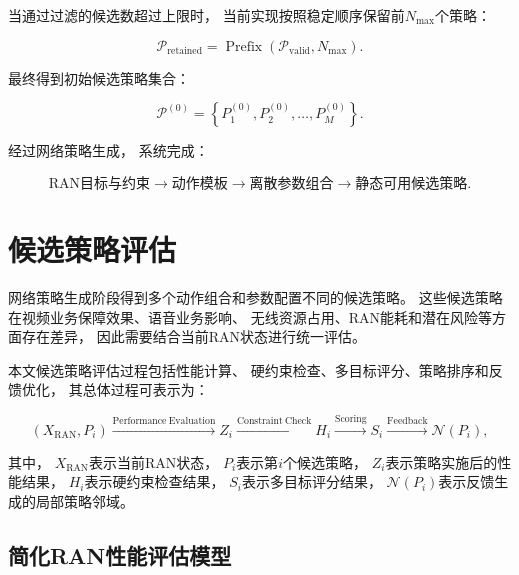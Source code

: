 \documentclass[lang=cn,12pt]{elegantbook}
\begin{document}
当通过过滤的候选数超过上限时，
当前实现按照稳定顺序保留前$N_{\max}$个策略：

\begin{equation}
\mathcal{P}_{\mathrm{retained}}
=
\operatorname{Prefix}
\left(
\mathcal{P}_{\mathrm{valid}},
N_{\max}
\right).
\label{eq:policy_prefix_truncation_reduced}
\end{equation}

最终得到初始候选策略集合：

\begin{equation}
\mathcal{P}^{(0)}
=
\left\{
P_1^{(0)},
P_2^{(0)},
\ldots,
P_M^{(0)}
\right\}.
\label{eq:initial_policy_set_reduced}
\end{equation}

经过网络策略生成，
系统完成：

\begin{equation}
\text{RAN目标与约束}
\longrightarrow
\text{动作模板}
\longrightarrow
\text{离散参数组合}
\longrightarrow
\text{静态可用候选策略}.
\label{eq:ran_requirement_to_candidate_policies}
\end{equation}

\section{候选策略评估}
\label{sec:candidate_policy_evaluation}

网络策略生成阶段得到多个动作组合和参数配置不同的候选策略。
这些候选策略在视频业务保障效果、语音业务影响、
无线资源占用、RAN能耗和潜在风险等方面存在差异，
因此需要结合当前RAN状态进行统一评估。

本文候选策略评估过程包括性能计算、
硬约束检查、多目标评分、策略排序和反馈优化，
其总体过程可表示为：

\begin{equation}
\left(
X_{\mathrm{RAN}},
P_i
\right)
\xrightarrow{\mathrm{Performance\ Evaluation}}
Z_i
\xrightarrow{\mathrm{Constraint\ Check}}
H_i
\xrightarrow{\mathrm{Scoring}}
S_i
\xrightarrow{\mathrm{Feedback}}
\mathcal{N}(P_i),
\label{eq:policy_evaluation_flow_reduced}
\end{equation}

其中，
$X_{\mathrm{RAN}}$表示当前RAN状态，
$P_i$表示第$i$个候选策略，
$Z_i$表示策略实施后的性能结果，
$H_i$表示硬约束检查结果，
$S_i$表示多目标评分结果，
$\mathcal{N}(P_i)$表示反馈生成的局部策略邻域。


\subsection*{简化RAN性能评估模型}
\end{document}
